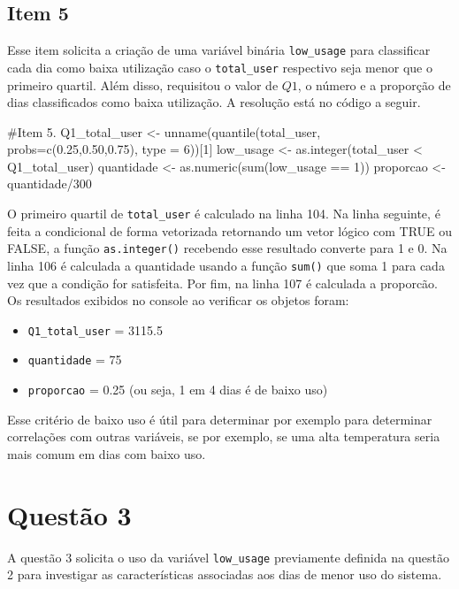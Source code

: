 \documentclass[a4paper, 12pt, titlepage]{article}
\begin{document}

\subsection*{Item 5}
Esse item solicita a criação de uma variável binária \texttt{low\_usage} para classificar cada dia como baixa utilização caso o \texttt{total\_user} respectivo seja menor que o primeiro quartil. Além disso, requisitou o valor de $Q1$, o número e a proporção de dias classificados como baixa utilização. A resolução está no código a seguir.

\begin{rcode}[firstnumber=103, caption={},breaklines=true, breakatwhitespace=true]
    #Item 5.
    Q1_total_user <- unname(quantile(total_user, probs=c(0.25,0.50,0.75), type = 6))[1]
    low_usage <- as.integer(total_user < Q1_total_user)
    quantidade <- as.numeric(sum(low_usage == 1))
    proporcao <- quantidade/300
\end{rcode}

O primeiro quartil de \texttt{total\_user} é calculado na linha 104. Na linha seguinte, é feita a condicional de forma vetorizada retornando um vetor lógico com TRUE ou FALSE, a função \texttt{as.integer()} recebendo esse resultado converte para 1 e 0. Na linha 106 é calculada a quantidade usando a função \texttt{sum()} que soma 1 para cada vez que a condição for satisfeita. Por fim, na linha 107 é calculada a proporcão. Os resultados exibidos no console ao verificar os objetos foram:
\begin{itemize}
    \item \texttt{Q1\_total\_user} = 3115.5
    \item \texttt{quantidade} = 75
    \item \texttt{proporcao} = 0.25 (ou seja, 1 em 4 dias é de baixo uso)
\end{itemize}

Esse critério de baixo uso é útil para determinar por exemplo para determinar correlações com outras variáveis, se por exemplo, se uma alta temperatura seria mais comum em dias com baixo uso.

\section*{Questão 3}
A questão 3 solicita o uso da variável \texttt{low\_usage} previamente definida na questão 2 para investigar as características associadas aos dias de menor uso do sistema.
\end{document}
